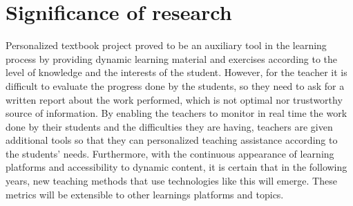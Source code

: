 \section{Significance of research}
Personalized textbook project \cite{Mircea2018} proved to be an auxiliary tool in the learning process by providing dynamic learning material and exercises according to the level of knowledge and the interests of the student. However, for the teacher it is difficult to evaluate the progress done by the students, so they need to ask for a written report about the work performed, which is not optimal nor trustworthy source of information. 
By enabling the teachers to monitor in real time the work done by their students and the difficulties they are having, teachers are given additional tools so that they can personalized teaching assistance according to the students’ needs.
Furthermore, with the continuous appearance of learning platforms and accessibility to dynamic content, it is certain that in the following years, new teaching methods that use technologies like this will emerge.
These metrics will be extensible to other learnings platforms and topics.



